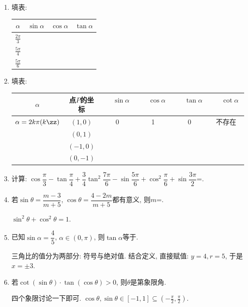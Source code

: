 \begin{enumerate}

\item 填表:

\begin{tabular}{|c|c|c|c|}\hline
$\alpha$ & $\sin\alpha$ & $\cos\alpha$ & $\tan\alpha$\\\hline
$\frac{2\pi}{3}$ & & & \\\hline
$\frac{5\pi}{4}$ & & & \\\hline
$\frac{5\pi}{6}$ & & & \\\hline
\end{tabular}


\item 填表:

\begin{tabular}{|c|c|c|c|c|c|}\hline
$\alpha$ & 点$P$的坐标 & ~~$\sin\alpha$~~ & ~~$\cos\alpha$~~ & ~~$\tan\alpha$~~ & ~~$\cot\alpha$~~ \\\hline
$\alpha=2k\pi(k\zz)$ & $(1,0)$ & 0 & 1 & 0 & 不存在\\\hline
& $(0,1)$ & & & & \\\hline
& $(-1,0)$ & & & & \\\hline
& $(0,-1)$ & & & & \\\hline
\end{tabular}


\item 计算: $\cos\dfrac{\pi}{3}-\tan\dfrac{\pi}{4}+\dfrac{3}{4}\tan^2\dfrac{7\pi}{6}-\sin\dfrac{5\pi}{6}+\cos^2\dfrac{\pi}{6}+\sin\dfrac{3\pi}{2}$=. 

\item 若$\sin\theta=\dfrac{m-3}{m+5}$, $\cos\theta=\dfrac{4-2m}{m+5}$都有意义, 则$m$=. 
\begin{jieda}
$\sin^2\theta+\cos^2\theta=1$. 
\end{jieda}

\item 已知$\sin\alpha=\dfrac{4}{5}$, $\alpha\in(0,\pi)$, 则$\tan\alpha$等于. 
\begin{jieda}
三角比的值分为两部分: 符号与绝对值. 结合定义, 直接赋值: $y=4,r=5$, 于是$x=\pm3$. 
\end{jieda}

\item 若$\cot(\sin\theta)\cdot\tan(\cos\theta)>0$, 则$\theta$是第象限角. 
\begin{jieda}
四个象限讨论一下即可. $\cos\theta,\sin\theta\in[-1,1]\subseteq(-\frac{\pi}{2},\frac{\pi}{2})$. 
\end{jieda}


\end{enumerate}
